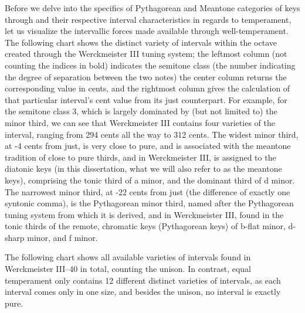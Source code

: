 Before we delve into the specifics of Pythagorean and Meantone
categories of keys through and their respective interval characteristics
in regards to temperament, let us visualize the intervallic forces made
available through well-temperament. The following chart shows the
distinct variety of intervals within the octave created through the
Werckmeister III tuning system; the leftmost column (not counting the
indices in bold) indicates the semitone class (the number indicating the
degree of separation between the two notes) the center column returns
the corresponding value in cents, and the rightmost column gives the
calculation of that particular interval's cent value from its just
counterpart. For example, for the semitone class 3, which is largely
dominated by (but not limited to) the minor third, we can see that
Werckmeister III contains four varieties of the interval, ranging from
294 cents all the way to 312 cents. The widest minor third, at -4 cents
from just, is very close to pure, and is associated with the meantone
tradition of close to pure thirds, and in Werckmeister III, is assigned
to the diatonic keys (in this dissertation, what we will also refer to
as the meantone keys), comprising the tonic third of a minor, and the
dominant third of d minor. The narrowest minor third, at -22 cents from
just (the difference of exactly one syntonic comma), is the Pythagorean
minor third, named after the Pythagorean tuning system from which it is
derived, and in Werckmeister III, found in the tonic thirds of the
remote, chromatic keys (Pythagorean keys) of b-flat minor, d-sharp
minor, and f minor.

The following chart shows all available varieties of intervals found in
Werckmeister III--40 in total, counting the unison. In contrast, equal
temperament only contains 12 different distinct varieties of intervals,
as each interval comes only in one size, and besides the unison, no
interval is exactly pure.


